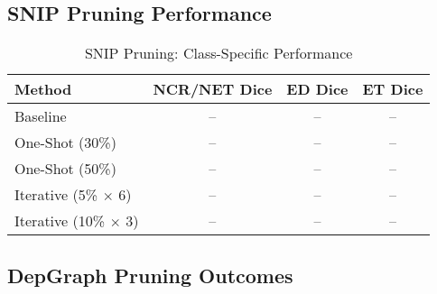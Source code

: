\documentclass[12pt,a4paper]{article}
\begin{document}
\subsection{SNIP Pruning Performance}

\begin{table}[htbp]
\centering
\caption{SNIP Pruning: One-Shot vs. Iterative Comparison}
\label{tab:snip_comparison}
\end{table}

\begin{table}[htbp]
\centering
\caption{SNIP Pruning: Class-Specific Performance}
\label{tab:snip_class_performance}
\begin{tabular}{lccc}
\toprule
\textbf{Method} & \textbf{NCR/NET Dice} & \textbf{ED Dice} & \textbf{ET Dice} \\
\midrule
Baseline & -- & -- & -- \\
One-Shot (30\%) & -- & -- & -- \\
One-Shot (50\%) & -- & -- & -- \\
Iterative (5\% $\times$ 6) & -- & -- & -- \\
Iterative (10\% $\times$ 3) & -- & -- & -- \\
\bottomrule
\end{tabular}
\end{table}

\subsection{DepGraph Pruning Outcomes}

\begin{table}[htbp]
\centering
\caption{DepGraph Pruning: Dependency-Aware vs. Naïve Pruning}
\label{tab:depgraph_comparison}
\end{table}
\end{document}
